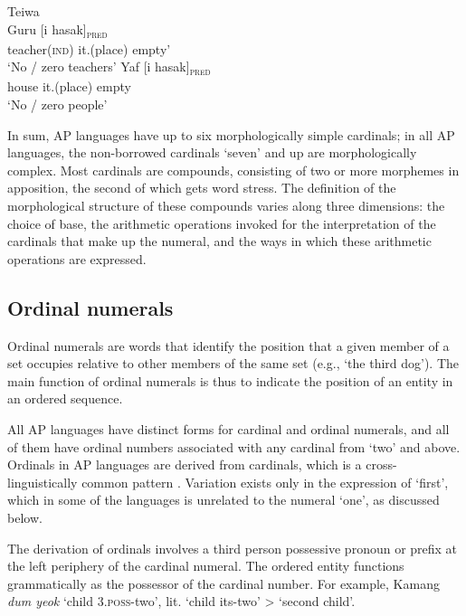 \ea%
\label{bkm:Ref355363568}
{\upshape Teiwa}\\
\ea
\label{ex:8:1234}
\gll Guru       [i       hasak]\textsubscript{\textsc{pred}} \\  
     teacher\textsc{(ind)}   it.(place)    empty'  \\
\glt  `No / zero teachers' 
\ex
\gll Yaf [i     hasak]\textsubscript{\textsc{pred}} \\
    house      it.(place)   empty\\
\glt    `No / zero people' 
\z
\z

In sum, AP languages have up to six morphologically simple cardinals; in all AP languages, the non-borrowed cardinals `seven' and up are morphologically complex. Most cardinals are compounds, consisting of two or more morphemes in apposition, the second of which gets word stress. The definition of the morphological structure of these compounds varies along three dimensions: the choice of base, the arithmetic operations invoked for the interpretation of the cardinals that make up the numeral, and the ways in which these arithmetic operations are expressed. 

\subsection{Ordinal  numerals}
\label{sec:8:Ordinal}
Ordinal numerals are words that identify the position that a given member of a set occupies relative to other members of the same set (e.g., `the third dog'). The main function of ordinal numerals is thus to indicate the position of an entity in an ordered sequence. 

All AP languages have distinct forms for cardinal and ordinal numerals, and all of them have ordinal numbers associated with any cardinal from `two' and above. Ordinals in AP languages are derived from cardinals, which is a cross-linguistically common pattern \citep{StolzEtAl2013}. Variation exists only in the expression of `first', which in some of the languages is unrelated to the numeral `one', as discussed below. 

The derivation of ordinals involves a third person possessive pronoun or prefix at the left periphery of the cardinal numeral. The ordered entity functions grammatically as the possessor of the cardinal number. For example, Kamang \textit{dum yeok} `child 3.\textsc{poss}{}-two', lit. `child its-two' {\textgreater} `second child'. 

